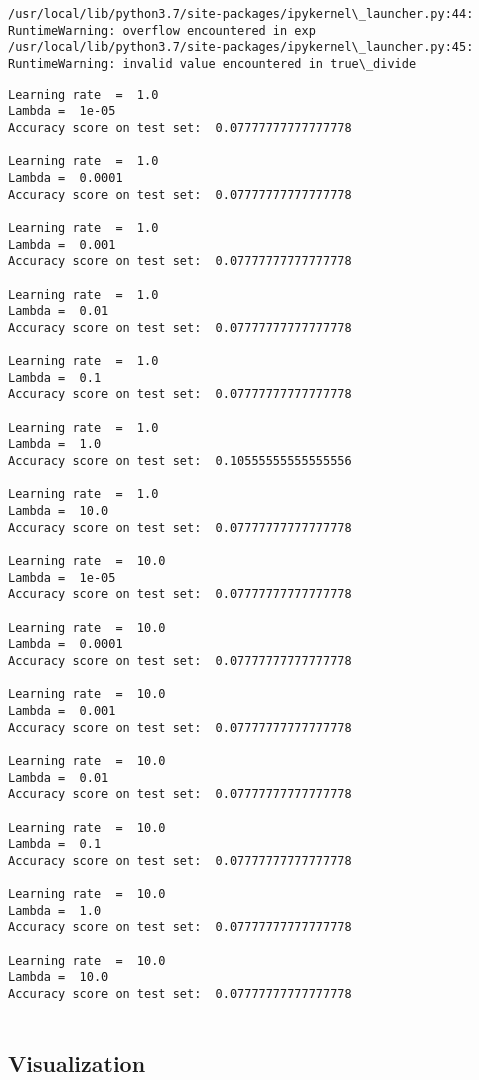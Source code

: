 \documentclass[11pt]{article}
\begin{document}
    \begin{Verbatim}[commandchars=\\\{\}]
/usr/local/lib/python3.7/site-packages/ipykernel\_launcher.py:44: RuntimeWarning: overflow encountered in exp
/usr/local/lib/python3.7/site-packages/ipykernel\_launcher.py:45: RuntimeWarning: invalid value encountered in true\_divide

    \end{Verbatim}

    \begin{Verbatim}[commandchars=\\\{\}]
Learning rate  =  1.0
Lambda =  1e-05
Accuracy score on test set:  0.07777777777777778

Learning rate  =  1.0
Lambda =  0.0001
Accuracy score on test set:  0.07777777777777778

Learning rate  =  1.0
Lambda =  0.001
Accuracy score on test set:  0.07777777777777778

Learning rate  =  1.0
Lambda =  0.01
Accuracy score on test set:  0.07777777777777778

Learning rate  =  1.0
Lambda =  0.1
Accuracy score on test set:  0.07777777777777778

Learning rate  =  1.0
Lambda =  1.0
Accuracy score on test set:  0.10555555555555556

Learning rate  =  1.0
Lambda =  10.0
Accuracy score on test set:  0.07777777777777778

Learning rate  =  10.0
Lambda =  1e-05
Accuracy score on test set:  0.07777777777777778

Learning rate  =  10.0
Lambda =  0.0001
Accuracy score on test set:  0.07777777777777778

Learning rate  =  10.0
Lambda =  0.001
Accuracy score on test set:  0.07777777777777778

Learning rate  =  10.0
Lambda =  0.01
Accuracy score on test set:  0.07777777777777778

Learning rate  =  10.0
Lambda =  0.1
Accuracy score on test set:  0.07777777777777778

Learning rate  =  10.0
Lambda =  1.0
Accuracy score on test set:  0.07777777777777778

Learning rate  =  10.0
Lambda =  10.0
Accuracy score on test set:  0.07777777777777778


    \end{Verbatim}

    \hypertarget{visualization}{%
\subsection{Visualization}\label{visualization}}
\end{document}
